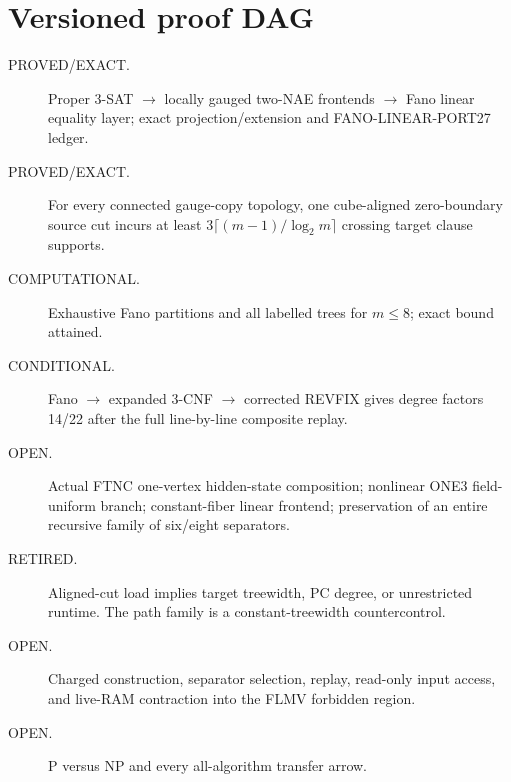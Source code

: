 \documentclass[11pt]{article}
\begin{document}
\section{Versioned proof DAG}
\begin{description}
\item[PROVED/EXACT.] Proper 3-SAT $\to$ locally gauged two-NAE frontends $\to$
Fano linear equality layer; exact projection/extension and FANO-LINEAR-PORT27
ledger.
\item[PROVED/EXACT.] For every connected gauge-copy topology, one cube-aligned
zero-boundary source cut incurs at least
$3\lceil(m-1)/\log_2m\rceil$ crossing target clause supports.
\item[COMPUTATIONAL.] Exhaustive Fano partitions and all labelled trees for
$m\le8$; exact bound attained.
\item[CONDITIONAL.] Fano $\to$ expanded 3-CNF $\to$ corrected REVFIX gives
degree factors 14/22 after the full line-by-line composite replay.
\item[OPEN.] Actual FTNC one-vertex hidden-state composition; nonlinear ONE3
field-uniform branch; constant-fiber linear frontend; preservation of an
entire recursive family of six/eight separators.
\item[RETIRED.] Aligned-cut load implies target treewidth, PC degree, or
unrestricted runtime.  The path family is a constant-treewidth countercontrol.
\item[OPEN.] Charged construction, separator selection, replay, read-only
input access, and live-RAM contraction into the FLMV forbidden region.
\item[OPEN.] P versus NP and every all-algorithm transfer arrow.
\end{description}
\end{document}
